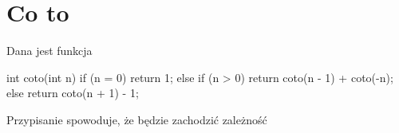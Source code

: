 \section{Co to}

\begin{problems}
    \prob Dana jest funkcja
    \begin{cpp}
        int coto(int n) {
            if (n = 0)
                return 1;
            else if (n > 0)
                return coto(n - 1) + coto(-n);
            else
                return coto(n + 1) - 1;
        }
    \end{cpp}
    Przypisanie  spowoduje, że będzie zachodzić zależność
\end{problems}

